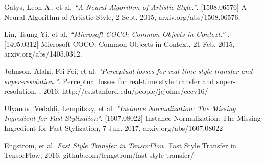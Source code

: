 \documentclass[12pt]{article}
\begin{document}
\newpage
\medskip
\begin{thebibliography}{9}
Gatys, Leon A., et al.
\textit{ “A Neural Algorithm of Artistic Style.”}.  [1508.06576] A Neural Algorithm of Artistic Style, 2 Sept. 2015, arxiv.org/abs/1508.06576.\

Lin, Tsung-Yi, et al. 
\textit{ “Microsoft COCO: Common Objects in Context.” }.  [1405.0312] Microsoft COCO: Common Objects in Context, 21 Feb. 2015, arxiv.org/abs/1405.0312.

Johnson, Alahi, Fei-Fei, et al.
\textit{"Perceptual losses for real-time style transfer and super-resolution."}. Perceptual losses for real-time style transfer and super-resolution. , 2016, http://cs.stanford.edu/people/jcjohns/eccv16/

Ulyanov, Vedaldi, Lempitsky, et al.
\textit{"Instance Normalization: The Missing Ingredient for Fast Stylization"}. [1607.08022] Instance Normalization: The Missing Ingredient for Fast Stylization, 7 Jun. 2017, arxiv.org/abs/1607.08022

Engstrom, et al.
\textit{Fast Style Transfer in TensorFlow}. Fast Style Transfer in TensorFlow, 2016, github.com/lengstrom/fast-style-transfer/

\end{thebibliography}
\end{document}
